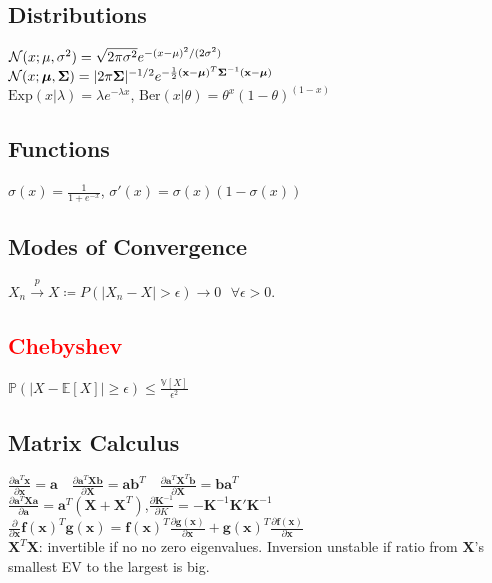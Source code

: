 \subsection*{Distributions}
$\mathcal{N}(x;\mu, \sigma^2)=\sqrt{2\pi\sigma^2}e^{-(x-\mu)^2/(2\sigma^2)}$\\
$\mathcal{N}(x;\bm{\mu}, \bm{\Sigma})= |2\pi\bm{\Sigma}|^{-1/2} e^{-\frac{1}{2}(\mathbf{x}-\bm{\mu})^T\bm{\Sigma}^{-1}(\mathbf{x}-\bm{\mu})} $\\
$\mathrm{Exp}(x|\lambda){=}\lambda e^{-\lambda x}$, $\mathrm{Ber}(x|\theta){=}\theta^x (1{-}\theta)^{(1-x)}$

\subsection*{Functions}
$\sigma(x)=\frac{1}{1+e^{-x}}$, $\sigma'(x)=\sigma(x)(1-\sigma(x))$

\subsection*{Modes of Convergence}
$X_n \overset{p}{\to} X \coloneqq P(|X_n-X|>\epsilon){\to} 0 \,\,\,\,\forall \epsilon > 0$.

\subsection*{\textcolor{red}{Chebyshev}}
$\mathbb{P}(|X-\mathbb{E}[X]|\geq \epsilon)\leq \frac{\mathbb{V}[X]}{\epsilon^2}$\\

\subsection*{Matrix Calculus}
$\frac{\partial \mathbf{a}^T\mathbf{x}}{\partial\mathbf{x}}{=}\mathbf{a} \quad \frac{\partial \mathbf{a}^T\mathbf{Xb}}{\partial\mathbf{X}}{=}\mathbf{ab}^T \quad \frac{\partial \mathbf{a}^T\mathbf{X}^T\mathbf{b}}{\partial\mathbf{X}}{=}\mathbf{ba}^T $\\
$\frac{\partial \mathbf{a}^T\mathbf{Xa}}{\partial\mathbf{a}}{=}\mathbf{a}^T(\mathbf{X}+\mathbf{X}^T)$,$\frac{\partial \mathbf{K}^{-1}}{\partial K}=-\mathbf{K}^{-1}\mathbf{K}'\mathbf{K}^{-1}$\\
 $\frac{\partial}{\partial\mathbf{x}} \mathbf{f(x)}^T\mathbf{g(x)}{=}\mathbf{f(x)}^T\frac{\partial \mathbf{g(x)}}{\partial\mathbf{x}}+\mathbf{g(x)}^T\frac{\partial\mathbf{f(x)}}{\partial\mathbf{x}}$\\
$\mathbf{X}^T\mathbf{X}$: invertible if no no zero eigenvalues.
Inversion unstable if ratio from $\mathbf{X}$'s smallest EV to the largest is big.

